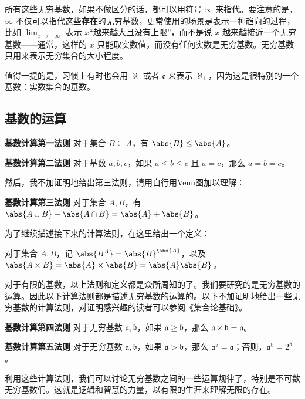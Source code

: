 所有这些无穷基数，如果不做区分的话，都可以用符号 $\infty$ 来指代。要注意的是，$\infty$ 不仅可以指代这些\textbf{存在}的无穷基数，更常使用的场景是表示一种趋向的过程，比如 $\lim_{x\rightarrow +\infty}$ 表示 $x$“越来越大且没有上限”，而不是说 $x$ 越来越接近一个无穷基数——通常，这样的 $x$ 只能取实数值，而没有任何实数是无穷基数。无穷基数只用来表示无穷集合的大小程度。

值得一提的是，习惯上有时也会用 $\aleph$ 或者 $\mathfrak{c}$ 来表示 $\aleph_1$，因为这是很特别的一个基数：实数集合的基数。




\subsection{基数的运算}

\begin{theorem}{}
\textbf{基数计算第一法则} 对于集合 $B\subseteq A$，有 $\abs{B}\leq\abs{A}$。
\end{theorem}

\begin{theorem}{}
\textbf{基数计算第二法则} 对于基数 $a, b, c$，如果 $a\leq b\leq c$ 且 $a=c$，那么 $a=b=c$。
\end{theorem}

然后，我不加证明地给出第三法则，请用自行用Venn图加以理解：

\begin{theorem}{}\label{CardiN_the1}
\textbf{基数计算第三法则} 对于集合 $A, B$，有 $\abs{A\cup B}+\abs{A\cap B}=\abs{A}+\abs{B}$。
\end{theorem}

为了继续描述接下来的计算法则，在这里给出一个定义：

\begin{definition}{}
对于集合 $A, B$，记 $\abs{B^A}=\abs{B}^{\abs{A}}$，以及 $\abs{A\times B}=\abs{A}\times\abs{B}=\abs{A}\abs{B}$。
\end{definition}

对于有限的基数，以上法则和定义都是众所周知的了。我们要研究的是无穷基数的运算。因此以下计算法则都是描述无穷基数的运算的。以下不加证明地给出一些无穷基数的计算法则，对证明感兴趣的读者可以参阅《集合论基础》\cite{BasicSetTheory}。

\begin{theorem}{}
\textbf{基数计算第四法则} 对于无穷基数 $\mathfrak{a}, \mathfrak{b}$，如果 $\mathfrak{a}\geq\mathfrak{b}$，那么 $\mathfrak{a}\times\mathfrak{b}=\mathfrak{a}$。
\end{theorem}

\begin{theorem}{}
\textbf{基数计算第五法则} 对于无穷基数 $\mathfrak{a}, \mathfrak{b}$，如果 $\mathfrak{a}>\mathfrak{b}$，那么 $\mathfrak{a}^\mathfrak{b}=\mathfrak{a}$；否则，$\mathfrak{a}^\mathfrak{b}=2^\mathfrak{b}$。
\end{theorem}


利用这些计算法则，我们可以讨论无穷基数之间的一些运算规律了，特别是不可数无穷基数们。这就是逻辑和智慧的力量，以有限的生涯来理解无限的存在。








